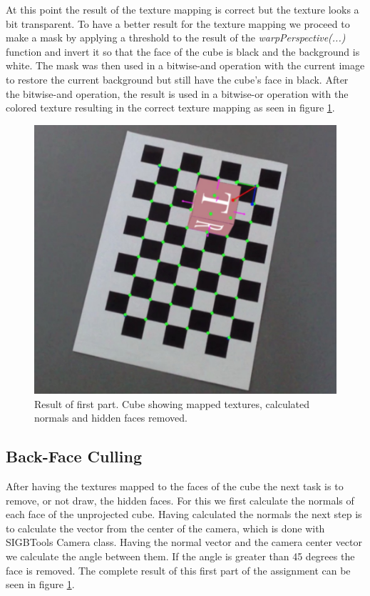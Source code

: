 At this point the result of the texture mapping is correct but the texture looks a bit transparent. To have a better result for the texture mapping we proceed to make a mask by applying a threshold to the result of the \emph{warpPerspective(...)} function and invert it so that the face of the cube is black and the background is white. The mask was then used in a bitwise-and operation with the current image to restore the current background but still have the cube's face in black. After the bitwise-and operation, the result is used in a bitwise-or operation with the colored texture resulting in the correct texture mapping as seen in figure \ref{fig:resultFirstPart}.
\begin{figure}
	\centering
	\includegraphics[scale=0.7]{images/textureMapping.jpg}
	\caption{Result of first part. Cube showing mapped textures, calculated normals and hidden faces removed.}
	\label{fig:resultFirstPart}
\end{figure}

\subsection{Back-Face Culling}
After having the textures mapped to the faces of the cube the next task is to remove, or not draw, the hidden faces. For this we first calculate the normals of each face of the unprojected cube. Having calculated the normals the next step is to calculate the vector from the center of the camera, which is done with SIGBTools Camera class. Having the normal vector and the camera center vector we calculate the angle between them. If the angle is greater than 45 degrees the face is removed. The complete result of this first part of the assignment can be seen in figure \ref{fig:resultFirstPart}.